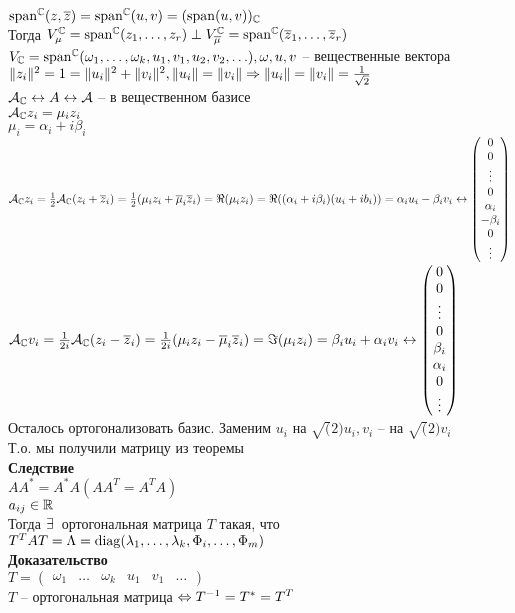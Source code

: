 \documentclass[12pt]{article}
\begin{document}
$\operatorname{span}^\mathbb{C}(z, \overline z) = \operatorname{span}^\mathbb{C}(u, v) = (\operatorname{span}(u,v))_\mathbb{C}$\\
Тогда $V_\mu^\mathbb{C} = \operatorname{span}^\mathbb{C}(z_1, \ldots, z_r) \perp V_{\overline \mu}^\mathbb{C} = \operatorname{span}^\mathbb{C}(\overline z_1, \ldots, \overline z_r)$\\
$V_\mathbb{C} = \operatorname{span}^\mathbb{C}(\omega_1, \ldots, \omega_k, u_1, v_1, u_2, v_2, \ldots), \omega, u, v$ -- вещественные вектора\\
$\|z_i\|^2 = 1 = \|u_i\|^2 + \|v_i\|^2, \|u_i\|=\|v_i\| \Rightarrow \|u_i\|=\|v_i\| = \frac1{\sqrt{2}}$\\
$\mathcal{A}_\mathbb{C} \leftrightarrow A \leftrightarrow \mathcal{A}$ -- в вещественном базисе\\
$\mathcal{A}_\mathbb{C} z_i = \mu_i z_i$\\
$\mu_i = \alpha_i + i \beta_i$\\
$\mathcal{A}_\mathbb{C} z_i = \frac12 \mathcal{A}_{\mathbb{C}}(z_i + \overline z_i) = \frac12(\mu_i z_i + \overline \mu_i \overline z_i) = \Re(\mu_i z_i) = \Re(( \alpha_i + i \beta_i)(u_i + i b_i)) = \alpha_i u_i - \beta_i v_i \leftrightarrow \begin{pmatrix}0\\0\\\vdots\\0\\ \alpha_i \\ - \beta_i\\0\\\vdots\end{pmatrix}$\\
$\mathcal{A}_\mathbb{C} v_i = \frac1{2i} \mathcal{A}_\mathbb{C}(z_i - \overline z_i) = \frac1{2i}(\mu_iz_i - \overline \mu_i \overline z_i) = \Im (\mu_i z_i) = \beta_i u_i + \alpha_i v_i \leftrightarrow \begin{pmatrix}0\\0\\\vdots\\0\\\beta_i\\\alpha_i\\0\\\vdots\end{pmatrix}$\\
Осталось ортогонализовать базис. Заменим $u_i$ на $\sqrt(2)u_i, v_i$ -- на $\sqrt(2)v_i$\\
Т.о. мы получили матрицу из теоремы\\
\textbf{Следствие}\\
$AA^* = A^*A(AA^T = A^TA)$\\
$a_{ij} \in \mathbb{R}$\\
Тогда $\exists\,$ ортогональная матрица $T$ такая, что $T^T AT = \Lambda = \operatorname{diag}( \lambda_1, \ldots, \lambda_k, \Phi_i, \ldots, \Phi_m)$\\
\textbf{Доказательство}\\
$T = \begin{pmatrix}\omega_1 & \ldots & \omega_k & u_1 & v_1 & \ldots\end{pmatrix}$\\
$T$ -- ортогональная матрица $\Leftrightarrow T^{-1} = T^* = T^T$
\end{document}
